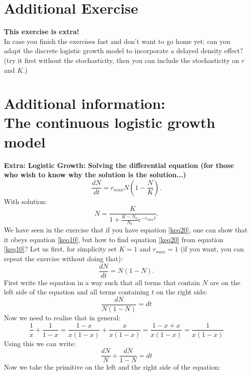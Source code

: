 \documentclass{article}\usepackage[]{graphicx}\usepackage[]{color}
\begin{document}
\section{Additional Exercise}
\textbf{This exercise is extra!\\}
In case you finish the exercises fast and don't want to go home yet: can you adapt the discrete logistic growth model to incorporate a delayed density effect? (try it first without the stochasticity, then you can include the stochasticity on $r$ and $K$.)

\section{Additional information:\\ The continuous logistic growth model}
\textbf{Extra: Logistic Growth: Solving the differential equation (for those who wish to know why the solution is the solution...)}\\
\begin{equation}
\frac{dN}{dt} = r_{max} N \left( 1-\frac{N}{K}\right).
\label{keq10}
\end{equation}
With solution:
\begin{equation}
N = \frac{K}{1+\frac{K-N_0}{N_0}e^{-r_{max}t}}.
\label{keq20}
\end{equation}
We have seen in the exercise that if you have equation \ref{keq20}, one can show that it obeys equation \ref{keq10}, but how to find equation \ref{keq20} from equation \ref{keq10}? Let us first, for simplicity set $K=1$ and $r_{max}=1$ (if you want, you can repeat the exercise without doing that):
\begin{equation}
\frac{dN}{dt} = N (1 -N).
\end{equation}
First write the equation in a way such that all terms that contain $N$ are on the left side of the equation and all terms containing $t$ on the right side:
\begin{equation}
\frac{dN}{N(1-N)} = dt
\end{equation}
Now we need to realise that in general:
\begin{equation}
\frac{1}{x} + \frac{1}{1-x} = \frac{1-x}{x(1-x)}+\frac{x}{x(1-x)} = \frac{1-x+x}{x(1-x)} = \frac{1}{x(1-x)}
\end{equation}
Using this we can write:
\begin{equation}
\frac{dN}{N} + \frac{dN}{1-N} = dt
\end{equation}
Now we take the primitive on the left and the right side of the equation:
\end{document}
